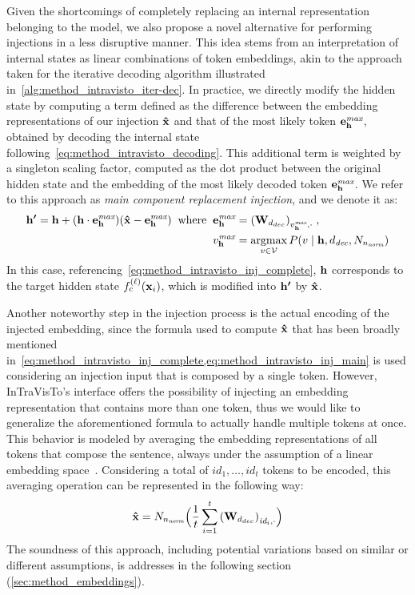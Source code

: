 Given the shortcomings of completely replacing an internal representation belonging to the model, we also propose a novel alternative for performing injections in a less disruptive manner.
This idea stems from an interpretation of internal states as linear combinations of token embeddings, akin to the approach taken for the iterative decoding algorithm illustrated in~\cref{alg:method_intravisto_iter-dec}.
In practice, we directly modify the hidden state by computing a term defined as the difference between the embedding representations of our injection $\bm{\mathbf{\hat x}}$ and that of the most likely token $\bm{\mathbf{e}}_{\bm{\mathbf{h}}}^{\textit{max}}$, obtained by decoding the internal state following~\cref{eq:method_intravisto_decoding}.
This additional term is weighted by a singleton scaling factor, computed as the dot product between the original hidden state and the embedding of the most likely decoded token $\bm{\mathbf{e}}_{\bm{\mathbf{h}}}^{\textit{max}}$.
We refer to this approach as \emph{main component replacement injection}, and we denote it as:
\begin{equation}
    \label{eq:method_intravisto_inj_main}
    \begin{aligned}
    \gbm{h'} = \gbm{h} + (\gbm{h} \cdot \gbm{e}_{\gbm{h}}^{\textit{max}})(\gbm{\hat x} - \gbm{e}_{\gbm{h}}^{\textit{max}})
    \;\; \text{where} \;\; &\gbm{e}_{\gbm{h}}^{\textit{max}} = {(\gbm{W}_{d_{dec}})}_{v_{\gbm{h}}^{\textit{max}},\cdot} \; , \\
    &v_{\gbm{h}}^{\textit{max}} = \operatornamewithlimits{argmax}_{v \in \mathcal{V}} P(v \mid \gbm{h}, d_\textit{dec}, N_{n_\textit{norm}})
    \end{aligned}
\end{equation}
In this case, referencing~\cref{eq:method_intravisto_inj_complete}, $\bm{\mathbf{h}}$ corresponds to the target hidden state $f_c^{(\ell)}(\bm{\mathbf{x}}_i)$, which is modified into $\bm{\mathbf{h'}}$ by $\bm{\mathbf{\hat x}}$.

Another noteworthy step in the injection process is the actual encoding of the injected embedding, since the formula used to compute $\bm{\mathbf{\hat x}}$ that has been broadly mentioned in~\cref{eq:method_intravisto_inj_complete,eq:method_intravisto_inj_main} is used considering an injection input that is composed by a single token.
However, InTraVisTo's interface offers the possibility of injecting an embedding representation that contains more than one token, thus we would like to generalize the aforementioned formula to actually handle multiple tokens at once.
This behavior is modeled by averaging the embedding representations of all tokens that compose the sentence, always under the assumption of a linear embedding space~\cite{mikolov2013,park2023}.
Considering a total of $id_1,\ldots,id_t$ tokens to be encoded, this averaging operation can be represented in the following way:
\begin{equation}
    \label{eq:method_intravisto_emb-avg}
    \bm{\mathbf{\hat x}} = N_{n_\textit{norm}}\Bigl(\frac{1}{t} \sum_{i=1}^{t}{{(\bm{\mathbf{W}}_{d_{dec}})}_{\textit{id}_{i},\cdot}}\Bigr)
\end{equation}
The soundness of this approach, including potential variations based on similar or different assumptions, is addresses in the following section (\cref{sec:method_embeddings}).


